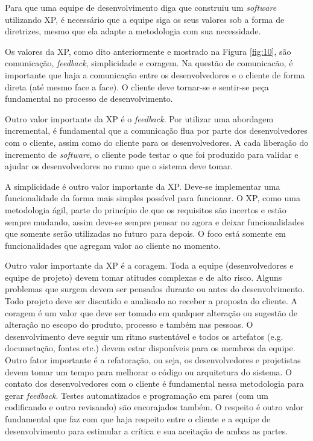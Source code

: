 Para que uma equipe de desenvolvimento diga que construiu um \textit{software} utilizando XP, é necessário que a equipe siga os seus valores sob a forma de diretrizes, mesmo que ela adapte a metodologia com sua necessidade. 

Os valores da XP, como dito anteriormente e mostrado na Figura \ref{fig:10}, são comunicação, \textit{feedback}, simplicidade e coragem. Na questão de comunicacão, é importante que haja a comunicação entre os desenvolvedores e o cliente de forma direta (até mesmo face a face). O cliente deve tornar-se e sentir-se peça fundamental no processo de desenvolvimento. 

Outro valor importante da XP é o \textit{feedback}. Por utilizar uma abordagem incremental, é fundamental que a comunicação flua por parte dos desenvolvedores com o cliente, assim como do cliente para os desenvolvedores. A cada liberação do incremento de \textit{software}, o cliente pode testar o que foi produzido para validar e ajudar os desenvolvedores no rumo que o sistema deve tomar. 

A simplicidade é outro valor importante da XP. Deve-se implementar uma funcionalidade da forma mais simples possível para funcionar. O XP, como uma metodologia ágil, parte do princípio de que os requisitos são incertos e estão sempre mudando, assim deve-se sempre pensar no agora e deixar funcionalidades que somente serão utilizadas no futuro para depois. O foco está somente em funcionalidades que agregam valor ao cliente no momento.

Outro valor importante da XP é a coragem. Toda a equipe (desenvolvedores e equipe de projeto) devem tomar atitudes complexas e de alto risco. Alguns problemas que surgem devem ser pensados durante ou antes do desenvolvimento. Todo projeto deve ser discutido e analisado ao receber a proposta do cliente. A coragem é um valor que deve ser tomado em qualquer alteração ou sugestão de alteração no escopo do produto, processo e também nas pessoas. O desenvolvimento deve seguir um ritmo sustentável e todos os artefatos (e.g. documetação, fontes etc.) devem estar disponíveis para os membros da equipe. Outro fator importante é a refatoração, ou seja, os desenvolvedores e projetistas devem tomar um tempo para melhorar o código ou arquitetura do sistema. O contato dos desenvolvedores com o cliente é fundamental nessa metodologia para gerar \textit{feedback}. Testes automatizados e programação em pares (com um codificando e outro revisando) são encorajados também. O respeito é outro valor fundamental que faz com que haja respeito entre o cliente e a equipe de desenvolvimento para estimular a crítica e sua aceitação de ambas as partes.

